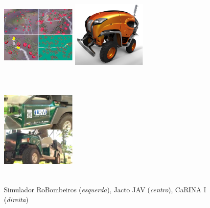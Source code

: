 \vspace{1cm}

\begin{figure}[!h]
  	\centering
	\begin{minipage}[b]{1.0\linewidth}
	    \includegraphics[width=0.33\textwidth,height=5cm]{images/robombeiros2.png}
	    \includegraphics[width=0.33\textwidth,height=5cm]{images/jacto.png}
	    \includegraphics[width=0.33\textwidth,height=5cm]{images/carina_1_stacked.png}
	 	\caption{Simulador RoBombeiros (\textit{esquerda}), 
	 	Jacto JAV (\textit{centro}), CaRINA I (\textit{direita})}
	 	\label{fig:um}
 	\end{minipage}
\end{figure}


